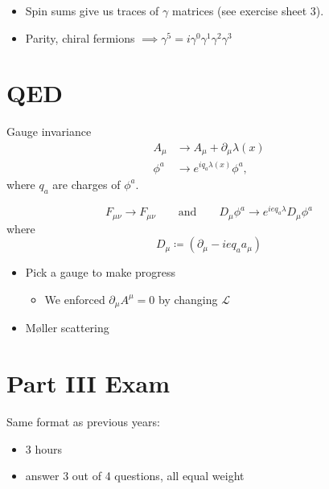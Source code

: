 \begin{itemize}
  \item Spin sums give us traces of $\gamma$ matrices (see exercise sheet 3).
  \item Parity, chiral fermions $\implies \gamma^5 = i \gamma^0 \gamma^1 \gamma^2 \gamma^3$
\end{itemize}

\section*{QED}%

Gauge invariance 
\begin{align}
  A_{\mu} &\to A_{\mu} + \partial_{\mu} \lambda(x) \\
  \phi^a &\to e^{i q_a \lambda(x)} \phi^a,
\end{align}
where $q_a$ are charges of $\phi^a$.

\begin{equation}
  F_{\mu\nu} \to F_{\mu\nu} \qquad \text{and} \qquad D_{\mu} \phi^a \to e^{i e q_a \lambda} D_{\mu} \phi^a
\end{equation}
where
\begin{equation}
  D_{\mu} \coloneqq (\partial_{\mu} - i e q_a a_{\mu})
\end{equation}

\begin{itemize}
  \item Pick a gauge to make progress
    \begin{itemize}
      \item We enforced $\partial_{\mu} A^{\mu} = 0$ by changing $\mathcal{L}$
    \end{itemize}
  \item M\o ller scattering
\end{itemize}

\section*{Part III Exam}%
\label{sec:part_iii_exam}

Same format as previous years:
\begin{itemize}
  \item 3 hours
  \item answer 3 out of 4 questions, all equal weight
\end{itemize}

